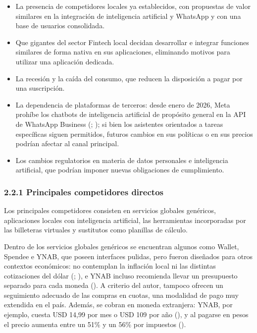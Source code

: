 \begin{itemize}
\tightlist
\item
  La presencia de competidores locales ya establecidos, con propuestas
  de valor similares en la integración de inteligencia artificial y
  WhatsApp y con una base de usuarios consolidada.
\item
  Que gigantes del sector Fintech local decidan desarrollar e integrar
  funciones similares de forma nativa en sus aplicaciones, eliminando
  motivos para utilizar una aplicación dedicada.
\item
  La recesión y la caída del consumo, que reducen la disposición a pagar
  por una suscripción.
\item
  La dependencia de plataformas de terceros: desde enero de 2026, Meta
  prohíbe los chatbots de inteligencia artificial de propósito general
  en la API de WhatsApp Business
  (;
  ); si bien los
  asistentes orientados a tareas específicas siguen permitidos, futuros
  cambios en sus políticas o en sus precios podrían afectar al canal
  principal.
\item
  Los cambios regulatorios en materia de datos personales e inteligencia
  artificial, que podrían imponer nuevas obligaciones de cumplimiento.
\end{itemize}


\subsubsection*{2.2.1 Principales competidores
directos}\label{principales-competidores-directos}

Los principales competidores consisten en servicios globales genéricos,
aplicaciones locales con inteligencia artificial, las herramientas
incorporadas por las billeteras virtuales y sustitutos como planillas de
cálculo.

Dentro de los servicios globales genéricos se encuentran algunos como
Wallet, Spendee e YNAB, que poseen interfaces pulidas, pero fueron
diseñados para otros contextos económicos: no contemplan la inflación
local ni las distintas cotizaciones del dólar
(;
), e YNAB incluso
recomienda llevar un presupuesto separado para cada moneda
(). A criterio del autor,
tampoco ofrecen un seguimiento adecuado de las compras en cuotas, una
modalidad de pago muy extendida en el país. Además, se cobran en moneda
extranjera: YNAB, por ejemplo, cuesta USD 14,99 por mes o USD 109 por
año (), y al pagarse en pesos
el precio aumenta entre un 51\% y un 56\% por impuestos
().

